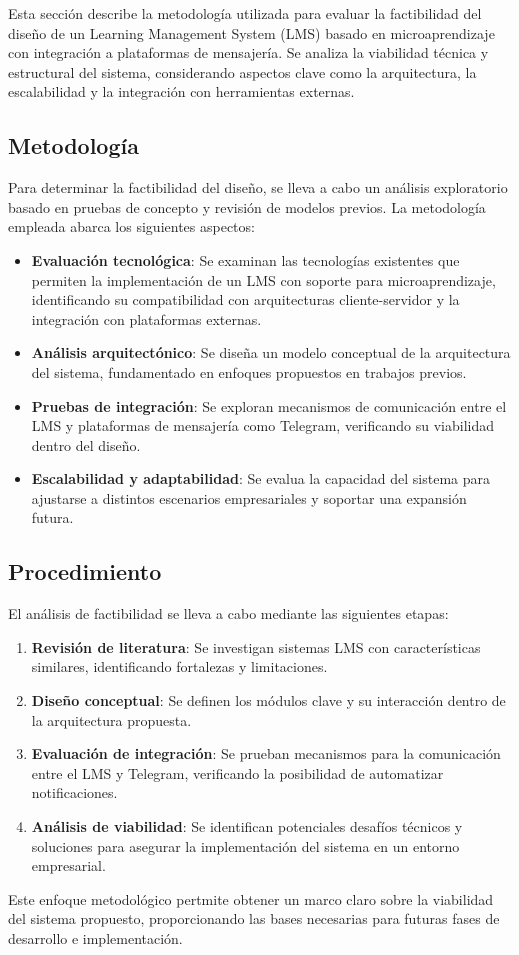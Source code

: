 Esta sección describe la metodología utilizada para evaluar la
factibilidad del diseño de un Learning Management System (LMS) basado
en microaprendizaje con integración a plataformas de mensajería. Se analiza la
viabilidad técnica y estructural del sistema, considerando aspectos clave como
la arquitectura, la escalabilidad y la integración con herramientas externas.  

\subsection{Metodología}  
Para determinar la factibilidad del diseño, se lleva a cabo un análisis
exploratorio basado en pruebas de concepto y revisión de modelos previos. La
metodología empleada abarca los siguientes aspectos:  

\begin{itemize}  
    \item \textbf{Evaluación tecnológica}: Se examinan las tecnologías
    existentes que permiten la implementación de un LMS con soporte para
    microaprendizaje, identificando su compatibilidad con arquitecturas
    cliente-servidor y la integración con plataformas externas.  
    \item \textbf{Análisis arquitectónico}: Se diseña un modelo conceptual de la
    arquitectura del sistema, fundamentado en enfoques propuestos en trabajos
    previos.  
    \item \textbf{Pruebas de integración}: Se exploran mecanismos de
    comunicación entre el LMS y plataformas de mensajería como Telegram,
    verificando su viabilidad dentro del diseño.  
    \item \textbf{Escalabilidad y adaptabilidad}: Se evalua la capacidad del
    sistema para ajustarse a distintos escenarios empresariales y soportar una
    expansión futura.  
\end{itemize}  

\subsection{Procedimiento}  
El análisis de factibilidad se lleva a cabo mediante las siguientes etapas:  

\begin{enumerate}  
    \item \textbf{Revisión de literatura}: Se investigan sistemas LMS con
    características similares, identificando fortalezas y limitaciones.  
    \item \textbf{Diseño conceptual}: Se definen los módulos clave y su
    interacción dentro de la arquitectura propuesta.  
    \item \textbf{Evaluación de integración}: Se prueban mecanismos para la
    comunicación entre el LMS y Telegram, verificando la posibilidad de
    automatizar notificaciones.  
    \item \textbf{Análisis de viabilidad}: Se identifican potenciales desafíos
    técnicos y soluciones para asegurar la implementación del sistema en un
    entorno empresarial.  
\end{enumerate}  

Este enfoque metodológico pertmite obtener un marco claro sobre la viabilidad
del sistema propuesto, proporcionando las bases necesarias para futuras fases de
desarrollo e implementación.  
